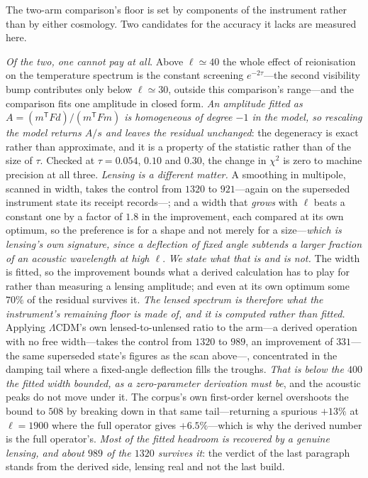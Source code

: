 \documentclass[11pt,a4paper]{article}
\theoremstyle{plain}
\theoremstyle{definition}
\theoremstyle{remark}
\begin{document}
The two-arm comparison's floor is set by components of the instrument rather than by either
cosmology. Two candidates for the accuracy it lacks are measured here.

\emph{Of the two, one cannot pay at all}. Above $\ell\simeq40$ the
whole effect of reionisation on the temperature spectrum is the constant screening $e^{-2\tau}$---the
second visibility bump contributes only below $\ell\simeq30$, outside this comparison's range---and
the comparison fits one amplitude in closed form. \emph{An amplitude fitted as
$A=(m^{\mathsf T}Fd)/(m^{\mathsf T}Fm)$ is homogeneous of degree $-1$ in the model, so rescaling the
model returns $A/s$ and leaves the residual unchanged}: the degeneracy is exact rather than
approximate, and it is a property of the statistic rather than of the size of $\tau$. Checked at
$\tau=0.054$, $0.10$ and $0.30$, the change in $\chi^{2}$ is zero to machine precision at all three.
\emph{Lensing is a different matter.} A smoothing in multipole, scanned in width, takes the control
from $1320$ to $921$---again on the superseded instrument state its receipt records---; and a width that \emph{grows} with $\ell$ beats a constant one by a factor of
$1.8$ in the improvement, each compared at its own optimum, so the preference is for a shape and not
merely for a size---\emph{which is lensing's own signature, since a deflection of fixed angle
subtends a larger fraction of an acoustic wavelength at high $\ell$}. \emph{We state what that is and
is not.} The width is fitted, so the improvement bounds what a derived calculation has to play for
rather than measuring a lensing amplitude; and even at its own optimum some $70\%$ of the residual
survives it. \emph{The lensed spectrum is therefore what the instrument's remaining floor is made of, and it is
computed rather than fitted.} Applying
$\Lambda$CDM's own lensed-to-unlensed ratio to the arm---a derived operation with no free width---takes
the control from $1320$ to $989$, an improvement of $331$---the same superseded state's figures as the scan above---, concentrated in the damping tail where a
fixed-angle deflection fills the troughs. \emph{That is below the $400$ the fitted width bounded, as a
zero-parameter derivation must be}, and the acoustic peaks do not move under it. The corpus's own
first-order kernel overshoots the bound to $508$ by breaking down in that same tail---returning a
spurious $+13\%$ at $\ell=1900$ where the full operator gives $+6.5\%$---which is why the derived
number is the full operator's. \emph{Most of the fitted headroom is recovered by a genuine lensing,
and about $989$ of the $1320$ survives it}: the verdict of the last paragraph stands from the derived
side, lensing real and not the last build.
\end{document}
